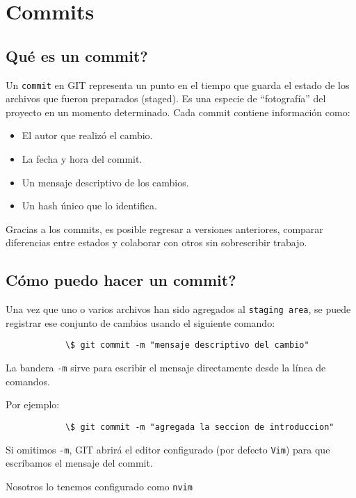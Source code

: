 \section{Commits}

    \subsection{Qu\'e es un commit?}
        Un \texttt{commit} en GIT representa un punto en el tiempo que guarda el estado de los archivos que fueron preparados (staged). Es una especie de ``fotograf\'ia'' del proyecto en un momento determinado. 
        Cada commit contiene informaci\'on como:
        \begin{itemize}
            \item El autor que realiz\'o el cambio.
            \item La fecha y hora del commit.
            \item Un mensaje descriptivo de los cambios.
            \item Un hash \'unico que lo identifica.
        \end{itemize}
        Gracias a los commits, es posible regresar a versiones anteriores, comparar diferencias entre estados y colaborar con otros sin sobrescribir trabajo.

    \subsection{C\'omo puedo hacer un commit?}
        Una vez que uno o varios archivos han sido agregados al \texttt{staging area}, se puede registrar ese conjunto de cambios usando el siguiente comando:
        \begin{lstlisting}
            \$ git commit -m "mensaje descriptivo del cambio"
        \end{lstlisting}
        La bandera \texttt{-m} sirve para escribir el mensaje directamente desde la l\'inea de comandos.
        
        Por ejemplo:
        \begin{lstlisting}
            \$ git commit -m "agregada la seccion de introduccion"
        \end{lstlisting}

        Si omitimos \texttt{-m}, GIT abrir\'a el editor configurado (por defecto \texttt{Vim}) para que escribamos el mensaje del commit.
    
        Nosotros lo tenemos configurado como \texttt{nvim}

